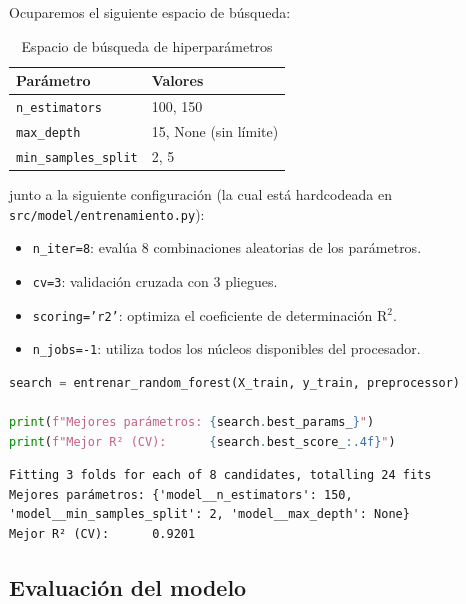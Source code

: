 Ocuparemos el siguiente espacio de búsqueda:

\begin{table}[ht]
 \centering
  \caption{Espacio de búsqueda de hiperparámetros}
    \begin{tabular}{l l}
      \hline
      \textbf{Parámetro} & \textbf{Valores} \\
      \hline
      \texttt{n\_estimators} & 100, 150 \\
      \texttt{max\_depth} & 15, None (sin límite) \\
      \texttt{min\_samples\_split} & 2, 5 \\
      \hline
    \end{tabular}
  \label{tab:hyperparametros}
\end{table}

junto a la siguiente configuración (la cual está hardcodeada en \texttt{src/model/entrenamiento.py}):
\begin{itemize}
  \item \texttt{n\_iter=8}: evalúa 8 combinaciones aleatorias de los parámetros.
  \item \texttt{cv=3}: validación cruzada con 3 pliegues.
  \item \texttt{scoring='r2'}: optimiza el coeficiente de determinación R$^2$.
  \item \texttt{n\_jobs=-1}: utiliza todos los núcleos disponibles del procesador.
\end{itemize}

\begin{lstlisting}[language=Python, caption={Entrenamiento con RandomizedSearchCV}, label={lst:entrenamiento-rf}]
search = entrenar_random_forest(X_train, y_train, preprocessor)

print(f"Mejores parámetros: {search.best_params_}")
print(f"Mejor R² (CV):      {search.best_score_:.4f}")
\end{lstlisting}

\begin{lstlisting}
Fitting 3 folds for each of 8 candidates, totalling 24 fits
Mejores parámetros: {'model__n_estimators': 150, 'model__min_samples_split': 2, 'model__max_depth': None}
Mejor R² (CV):      0.9201
\end{lstlisting}

\subsection{Evaluación del modelo}

